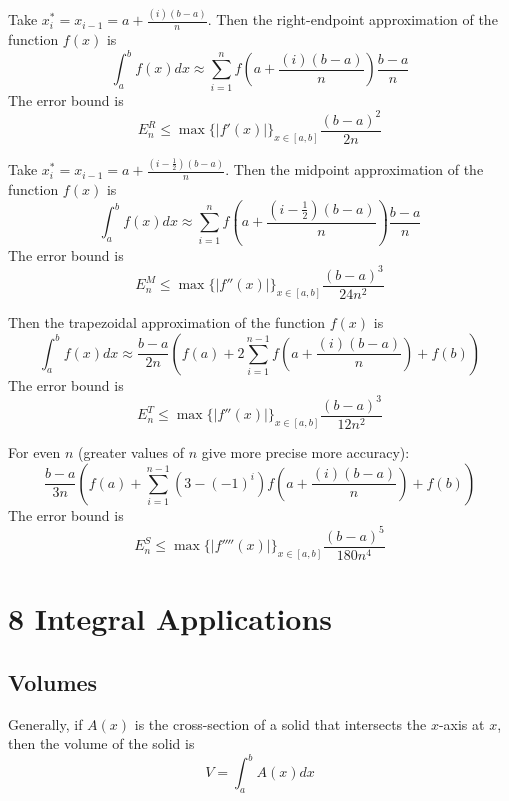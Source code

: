 \begin{definition}
  Take $x_i^* = x_{i-1} = a + \frac{(i)(b-a)}{n}$. Then the right-endpoint approximation of the function $f(x)$ is
  \[
    \int_a^b f(x) dx \approx \sum_{i=1}^n f\left(a + \frac{(i)(b-a)}{n}\right) \frac{b-a}{n}
  \]
  The error bound is
  \[
    E_n^R \leq \max\{|f'(x)|\}_{x \in [a, b]} \frac{(b-a)^2}{2n}
  \]
\end{definition}

\begin{definition}
  Take $x_i^* = x_{i-1} = a + \frac{(i-\frac{1}{2})(b-a)}{n}$. Then the midpoint approximation of the function $f(x)$ is
  \[
    \int_a^b f(x) dx \approx \sum_{i=1}^n f\left(a + \frac{(i-\frac{1}{2})(b-a)}{n}\right) \frac{b-a}{n}
  \]
  The error bound is
  \[
    E_n^M \leq \max\{|f''(x)|\}_{x \in [a, b]} \frac{(b-a)^3}{24n^2}
  \]
\end{definition}

\begin{definition}
  Then the trapezoidal approximation of the function $f(x)$ is
  \[
    \int_a^b f(x) dx \approx \frac{b-a}{2n} \left(f(a) + 2 \sum_{i=1}^{n-1} f\left(a + \frac{(i)(b-a)}{n}\right) + f(b)\right)
  \]
  The error bound is
  \[
    E_n^T \leq \max\{|f''(x)|\}_{x \in [a, b]} \frac{(b-a)^3}{12n^2}
  \]
\end{definition}

\begin{definition}
  For even $n$ (greater values of $n$ give more precise more accuracy):
  \[
    \frac{b-a}{3n} \left(f(a) + \sum_{i=1}^{n-1} (3 - (-1)^i) f\left(a + \frac{(i)(b-a)}{n}\right) + f(b)\right)
  \]
  The error bound is
  \[
    E_n^S \leq \max\{|f''''(x)|\}_{x \in [a, b]} \frac{(b-a)^5}{180n^4}
  \]
\end{definition}

\section*{8 Integral Applications}

\subsection*{Volumes}

Generally, if $A(x)$ is the cross-section of a solid that intersects the $x$-axis at $x$, then the volume of the solid is
\[
  V = \int_a^b A(x) dx
\]

